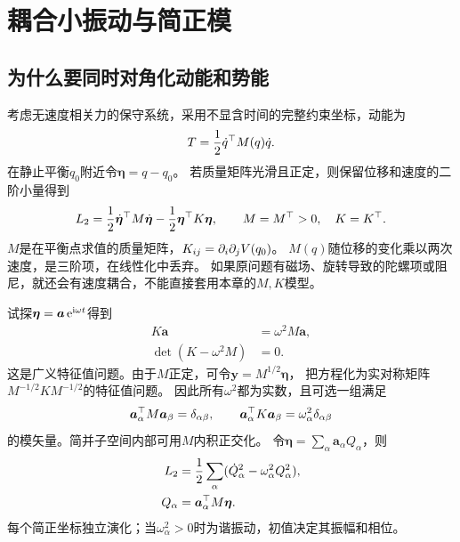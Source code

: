 \chapter{耦合小振动与简正模}

\section{为什么要同时对角化动能和势能}
考虑无速度相关力的保守系统，采用不显含时间的完整约束坐标，动能为
\begin{equation}\label{eq:cm-kinetic-mass-matrix}
 T = \frac12\dot q^\top M(q)\dot q.
\end{equation}
在静止平衡$q_0$附近令$\bm\eta = q - q_0$。
若质量矩阵光滑且正定，则保留位移和速度的二阶小量得到
\begin{equation}
 L_2 = \frac12\dot{\bm{\eta}}^\top M\dot{\bm{\eta}}
 - \frac12\bm\eta^\top K\bm\eta,
 \qquad M = M^\top > 0,\quad K = K^\top.
\end{equation}
$M$是在平衡点求值的质量矩阵，$K_{ij} = \partial_i\partial_jV(q_0)$。
$M(q)$随位移的变化乘以两次速度，是三阶项，在线性化中丢弃。
如果原问题有磁场、旋转导致的陀螺项或阻尼，就还会有速度耦合，不能直接套用本章的$M,K$模型。

试探$\bm\eta = \bm a\mathop{}\!\mathrm{e}^{\mathrm{i}\omega t}$得到
\begin{subequations}
 \begin{align}
  K\bm a &= \omega^2M\bm a, \label{eq:cm-generalized-eig}\\
  \det(K - \omega^2M) &= 0.
 \end{align}
\end{subequations}
这是广义特征值问题。由于$M$正定，可令$\bm y = M^{1/2}\bm\eta$，
把方程化为实对称矩阵$M^{-1/2}KM^{-1/2}$的特征值问题。
因此所有$\omega^2$都为实数，且可选一组满足
\begin{equation}
 \bm a_\alpha^\top M\bm a_\beta = \delta_{\alpha\beta},\qquad
 \bm a_\alpha^\top K\bm a_\beta = \omega_\alpha^2\delta_{\alpha\beta}
\end{equation}
的模矢量。简并子空间内部可用$M$内积正交化。
令$\textstyle \bm\eta = \sum_\alpha\bm a_\alpha Q_\alpha$，则
\begin{subequations}
 \begin{align}
  L_2 &= \frac12\sum_\alpha(\dot Q_\alpha^2 - \omega_\alpha^2Q_\alpha^2),\\
  Q_\alpha &= \bm a_\alpha^\top M\bm\eta.
 \end{align}
\end{subequations}
每个简正坐标独立演化；当$\omega_\alpha^2 > 0$时为谐振动，初值决定其振幅和相位。

